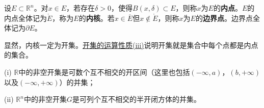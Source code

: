 \documentclass[../../main.tex]{subfiles}
\begin{document}
\begin{definition}[内点与边界点]\label{definition:内点与边界点}
  设\(E\subset\mathbb{R}^n\)。对\(x\in E\)，若存在\(\delta>0\)，使得\(B(x,\delta)\subset E\)，则称\(x\)为\(E\)的\textbf{内点}。\(E\)的内点全体记为\(\mathring{E}\)，称为\(E\)的\textbf{内核}。若\(x\in\overline{E}\)但\(x\notin\mathring{E}\)，则称\(x\)为\(E\)的\textbf{边界点}。边界点全体记为\(\partial E\)。
\end{definition}
\begin{note}
  显然，内核一定为开集。\hyperref[theorem:开集的运算性质]{开集的运算性质(iii)}说明开集就是集合中每个点都是内点的集合。
\end{note}

\begin{theorem}[开集构造定理]\label{theorem:开集构造定理}
(i) \(\mathbb{R}\)中的非空开集是可数个互不相交的开区间（这里也包括\((-\infty,a)\)，\((b,+\infty)\)以及\((-\infty,+\infty)\)）的并集；

(ii) \(\mathbb{R}^n\)中的非空开集\(G\)是可列个互不相交的半开闭方体的并集。
\end{theorem}
\end{document}
